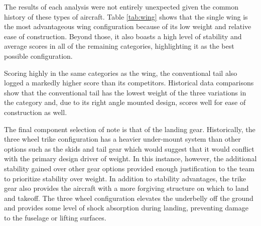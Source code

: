 \documentclass[titlepage]{article}
\begin{document}
\begin{table}[h!]
\caption{Wing Design Matrix}
\label{tab:wing}
\end{table}

The results of each analysis were not entirely unexpected given the common history of these types of aircraft. Table \ref{tab:wing} shows that the single wing is the most advantageous wing configuration because of its low weight and relative ease of construction. Beyond those, it also boasts a high level of stability and average scores in all of the remaining categories, highlighting it as the best possible configuration.

Scoring highly in the same categories as the wing, the conventional tail also logged a markedly higher score than its competitors. Historical data comparisons show that the conventional tail has the lowest weight of the three variations in the category and, due to its right angle mounted design, scores well for ease of construction as well.

The final component selection of note is that of the landing gear. Historically, the three wheel trike configuration has a heavier under-mount system than other options such as the skids and tail gear which would suggest that it would conflict with the primary design driver of weight. In this instance, however, the additional stability gained over other gear options provided enough justification to the team to prioritize stability over weight. In addition to stability advantages, the trike gear also provides the aircraft with a more forgiving structure on which to land and takeoff. The three wheel configuration elevates the underbelly off the ground and provides some level of shock absorption during landing, preventing damage to the fuselage or lifting surfaces. 
\end{document}
